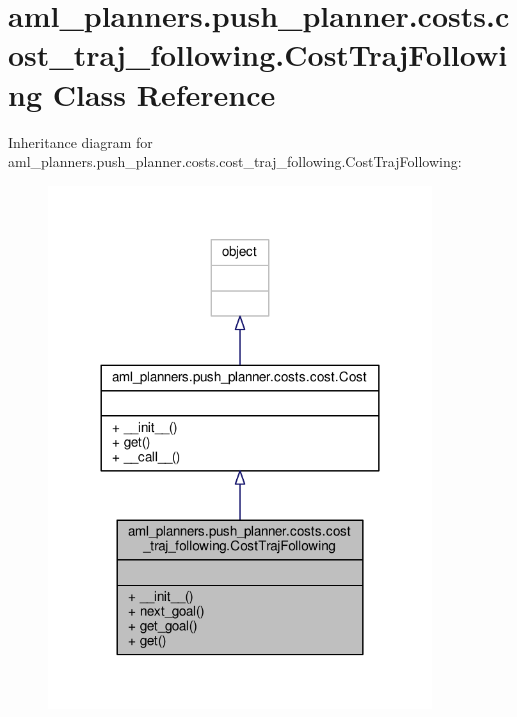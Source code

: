 \hypertarget{classaml__planners_1_1push__planner_1_1costs_1_1cost__traj__following_1_1_cost_traj_following}{\section{aml\-\_\-planners.\-push\-\_\-planner.\-costs.\-cost\-\_\-traj\-\_\-following.\-Cost\-Traj\-Following Class Reference}
\label{classaml__planners_1_1push__planner_1_1costs_1_1cost__traj__following_1_1_cost_traj_following}
}


Inheritance diagram for aml\-\_\-planners.\-push\-\_\-planner.\-costs.\-cost\-\_\-traj\-\_\-following.\-Cost\-Traj\-Following\-:
\nopagebreak
\begin{figure}[H]
\begin{center}
\leavevmode
\includegraphics[width=288pt]{classaml__planners_1_1push__planner_1_1costs_1_1cost__traj__following_1_1_cost_traj_following__inherit__graph}
\end{center}
\end{figure}


